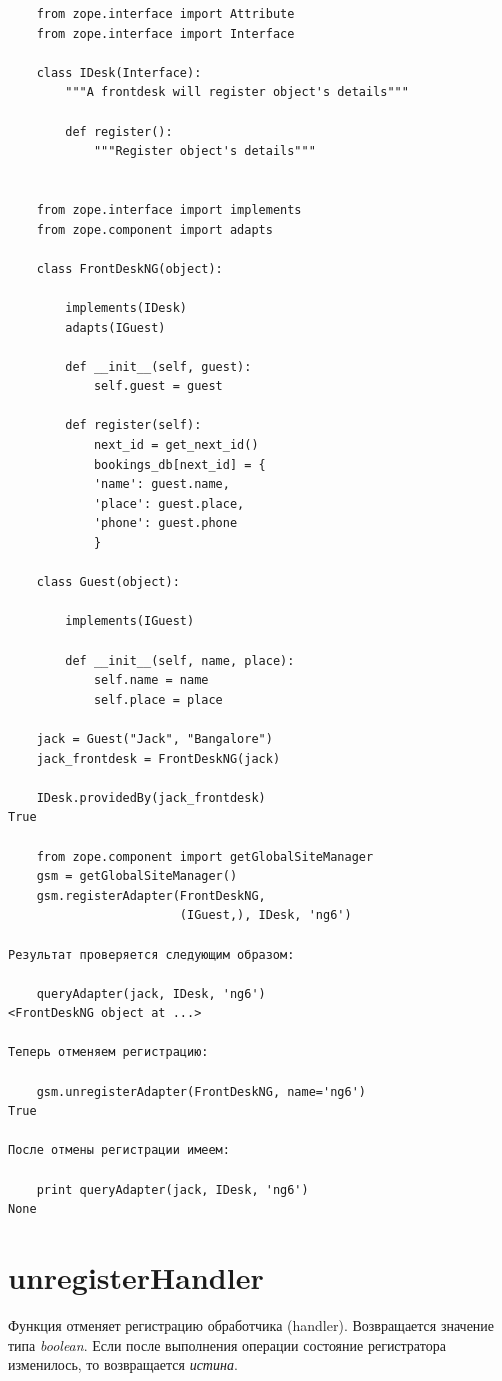 \documentclass[a4paper,openany,twoside,draft]{book}
\providecommand*{\DUroletitlereference}[1]{\textsl{#1}}
\begin{document}
\begin{verbatim}
    from zope.interface import Attribute
    from zope.interface import Interface

    class IDesk(Interface):
        """A frontdesk will register object's details"""

        def register():
            """Register object's details"""


    from zope.interface import implements
    from zope.component import adapts

    class FrontDeskNG(object):

        implements(IDesk)
        adapts(IGuest)

        def __init__(self, guest):
            self.guest = guest

        def register(self):
            next_id = get_next_id()
            bookings_db[next_id] = {
            'name': guest.name,
            'place': guest.place,
            'phone': guest.phone
            }

    class Guest(object):

        implements(IGuest)

        def __init__(self, name, place):
            self.name = name
            self.place = place

    jack = Guest("Jack", "Bangalore")
    jack_frontdesk = FrontDeskNG(jack)

    IDesk.providedBy(jack_frontdesk)
True

    from zope.component import getGlobalSiteManager
    gsm = getGlobalSiteManager()
    gsm.registerAdapter(FrontDeskNG,
                        (IGuest,), IDesk, 'ng6')

Результат проверяется следующим образом:

    queryAdapter(jack, IDesk, 'ng6')
<FrontDeskNG object at ...>

Теперь отменяем регистрацию:

    gsm.unregisterAdapter(FrontDeskNG, name='ng6')
True

После отмены регистрации имеем:

    print queryAdapter(jack, IDesk, 'ng6')
None
\end{verbatim}


\section*{unregisterHandler%
  \label{unregisterhandler}%
}

Функция отменяет регистрацию обработчика (handler). Возвращается значение типа \DUroletitlereference{boolean}.  Если после выполнения операции состояние регистратора изменилось, то возвращается \DUroletitlereference{истина}.
\end{document}

